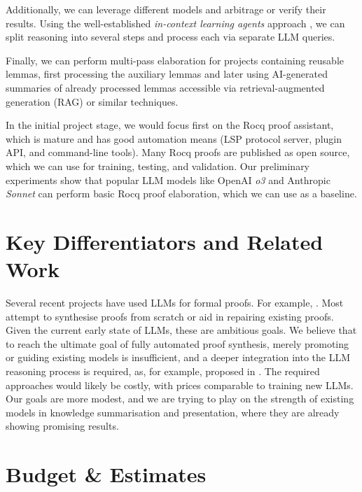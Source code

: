 \documentclass[10pt,nonacm,natbib=false]{acmart}
\begin{document}
Additionally, we can leverage different models and arbitrage or verify
their results. Using the well-established \textit{in-context learning
  agents} approach \cite{wei2022chain}, we can split reasoning into
several steps and process each via separate LLM queries.

Finally, we can perform multi-pass elaboration for projects containing
reusable lemmas, first processing the auxiliary lemmas and later using
AI-generated summaries of already processed lemmas accessible via
retrieval-augmented generation (RAG) or similar techniques.

In the initial project stage, we would focus first on the Rocq proof
assistant, which is mature and has good automation means (LSP protocol
server, plugin API, and command-line tools). Many Rocq proofs are
published as open source, which we can use for training, testing, and
validation. Our preliminary experiments show that popular LLM models
like OpenAI \textit{o3} and Anthropic \textit{Sonnet} can perform basic Rocq
proof elaboration, which we can use as a baseline.

\section*{Key Differentiators and Related Work}

Several recent projects have used LLMs for formal proofs. For example,
\cite{DBLP:conf/kbse/LuD024, DBLP:journals/corr/abs-2410-14835, thakur2024incontextlearningagentformal, DBLP:conf/icml/YangD19,
  DBLP:conf/kbse/KozyrevSKP24, DBLP:conf/nips/YangSGCSYGPA23,
  DBLP:conf/emnlp/WangZJPDPZ24}. Most attempt to synthesise proofs
from scratch or aid in repairing existing proofs. Given the current
early state of LLMs, these are ambitious goals. We believe that to
reach the ultimate goal of fully automated proof synthesis, merely
promoting or guiding existing models is insufficient, and a deeper
integration into the LLM reasoning process is required, as, for
example, proposed in \cite{park2024grammaraligneddecoding}. The
required approaches would likely be costly, with prices comparable to
training new LLMs. Our goals are more modest, and we are trying to
play on the strength of existing models in knowledge summarisation and
presentation, where they are already showing promising results.

\section*{Budget \& Estimates}
\end{document}

